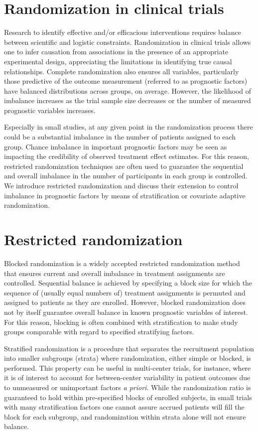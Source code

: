 \section[Randomization in RCTs]{Randomization in clinical trials}
Research to identify effective and/or efficacious interventions requires balance between scientific and logistic constraints. 
Randomization in clinical trials allows one to infer causation from associations in the presence of an appropriate experimental design, appreciating the limitations in identifying true causal relationships. 
Complete randomization also ensures all variables, particularly those predictive of the outcome measurement (referred to as prognostic factors) have balanced distributions across groups, on average. 
However, the likelihood of imbalance increases as the trial sample size decreases or the number of measured prognostic variables increases.  

Especially in small studies, at any given point in the randomization process there could be a substantial imbalance in the number of patients assigned to each group.  
Chance imbalance in important prognostic factors may be seen as impacting the credibility of observed treatment effect estimates. 
For this reason, restricted randomization techniques are often used to guarantee the sequential and overall imbalance in the number of participants in each group is controlled.
We introduce restricted randomization and discuss their extension to control imbalance in prognostic factors by means of stratification or covariate adaptive randomization.

\section{Restricted randomization}
Blocked randomization is a widely accepted restricted randomization method that ensures current and overall imbalance in treatment assignments are controlled.  
Sequential balance is achieved by specifying a block size for which the sequence of (usually equal numbers of) treatment assignments is permuted and assigned to patients as they are enrolled. 
However, blocked randomization does not by itself guarantee overall balance in known prognostic variables of interest.  
For this reason, blocking is often combined with stratification to make study groups comparable with regard to specified stratifying factors.  

Stratified randomization is a procedure that separates the recruitment population into smaller subgroups (strata) where randomization, either simple or blocked, is performed.  
This property can be useful in multi-center trials, for instance, where it is of interest to account for between-center variability in patient outcomes due to unmeasured or unimportant factors \textit{a priori}. 
While the randomization ratio is guaranteed to hold within pre-specified blocks of enrolled subjects, in small trials with many stratification factors one cannot assure accrued patients will fill the block for each subgroup, and randomization within strata alone will not ensure balance.  


